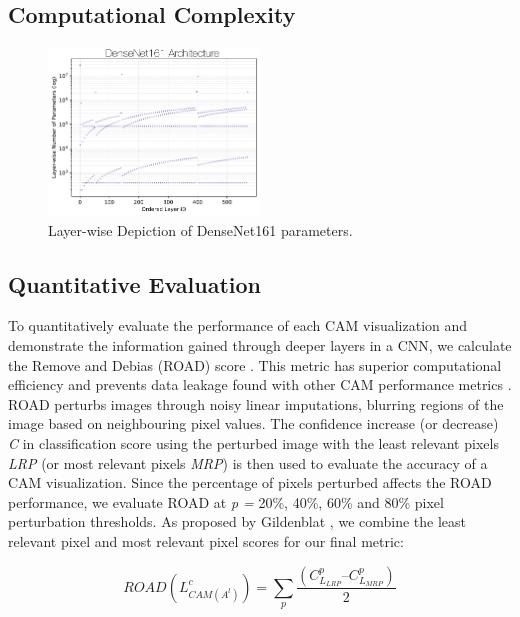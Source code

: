 \documentclass[10pt, conference, compsocconf]{IEEEtran}
\begin{document}
\subsection{Computational Complexity}


\begin{figure}
    \centering
    \includegraphics[width=0.5\textwidth]{figures/densenet161_num-params.pdf}
    \caption{Layer-wise Depiction of DenseNet161 parameters.}
    \label{fig:densenet-params}
\end{figure}



\subsection{Quantitative Evaluation}
To quantitatively evaluate the performance of each CAM visualization and demonstrate the information gained through deeper layers in a CNN, we calculate the Remove and Debias (ROAD) score \cite{Rong22}. This metric has superior computational efficiency and prevents data leakage found with other CAM performance metrics \cite{Rong22}. ROAD perturbs images through noisy linear imputations, blurring regions of the image based on neighbouring pixel values. The confidence increase (or decrease) \textit{C} in classification score using the perturbed image with the least relevant pixels \textit{LRP} (or most relevant pixels \textit{MRP}) is then used to evaluate the accuracy of a CAM visualization. Since the percentage of pixels perturbed affects the ROAD performance, we evaluate ROAD at \textit{p =} 20\%, 40\%, 60\% and 80\% pixel perturbation thresholds. As proposed by Gildenblat \cite{Gildenblat21}, we combine the least relevant pixel and most relevant pixel scores for our final metric: 

\begin{equation}
ROAD(L^c_{CAM(A^{l})}) = \sum\limits_{p} \frac{(C^p_{L_{LRP}} – C^p_{L_{MRP}})}{2}
\end{equation}
\end{document}
